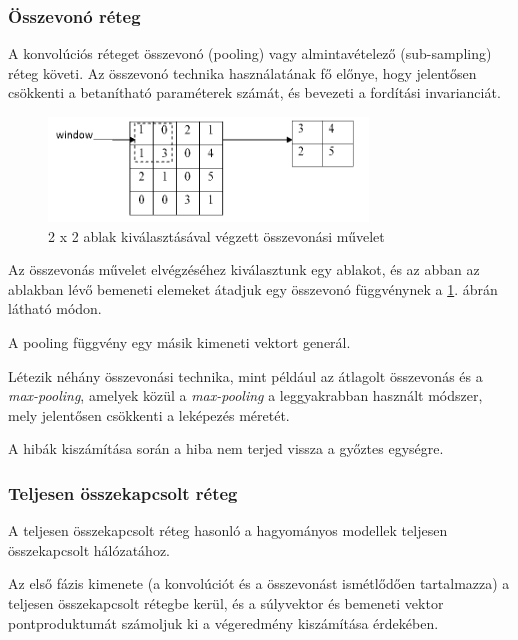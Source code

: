 \documentclass[12pt,a4]{article}
\begin{document}
	\subsubsection{Összevonó réteg}

	A konvolúciós réteget összevonó (pooling) vagy 
	almintavételező (sub-sampling) \cite{CNN} réteg követi.
	Az összevonó technika használatának fő előnye, hogy 
	jelentősen csökkenti a betanítható paraméterek számát,
	és bevezeti a fordítási invarianciát. 

    \begin{figure}[h]	
		\centering
		\includegraphics[width=0.7\linewidth]{pooling}
		\caption{\cite{CNN} 2 x 2 ablak kiválasztásával végzett összevonási művelet}
        \label{fig:pooling}
	\end{figure}
 
	Az összevonás művelet elvégzéséhez kiválasztunk egy ablakot,
	és az abban az ablakban lévő bemeneti elemeket átadjuk
	egy összevonó függvénynek a \ref{fig:pooling}. ábrán látható módon.
	
	\newpage
	
	A pooling függvény egy másik kimeneti vektort generál.
	
	Létezik néhány összevonási technika, mint például az átlagolt összevonás 
	és a \textit{max-pooling}, amelyek közül a \textit{max-pooling} a leggyakrabban használt módszer,
	mely jelentősen csökkenti a leképezés méretét.
	
	A hibák kiszámítása során a hiba nem terjed vissza a győztes egységre.
	
	\subsubsection{Teljesen összekapcsolt réteg}
	
	A teljesen összekapcsolt réteg \cite{CNN} hasonló a hagyományos modellek teljesen összekapcsolt hálózatához.
	
	Az első
	fázis kimenete (a konvolúciót és a összevonást ismétlődően tartalmazza) a teljesen összekapcsolt rétegbe kerül, és a súlyvektor és bemeneti vektor pontproduktumát számoljuk ki a végeredmény kiszámítása érdekében.
	
\end{document}
